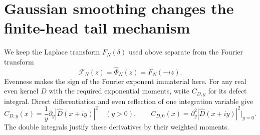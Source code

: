 \documentclass[11pt]{article}
\theoremstyle{remark}\newtheorem{remark}[theorem]{Remark}
\begin{document}
\section{Gaussian smoothing changes the finite-head tail mechanism}
We keep the Laplace transform $F_N(\delta)$ used above separate from
the Fourier transform
\[
 \mathcal F_N(z)=\widehat\Phi_N(z)=F_N(-iz).
\]
Evenness makes the sign of the Fourier exponent immaterial here.
For any real even kernel $D$ with the required exponential moments,
write $C_{D,y}$ for its defect integral. Direct differentiation and
even reflection of one integration variable give
\[
 C_{D,y}(x)=\frac1y\partial_y|\widehat D(x+iy)|^2\quad(y>0),
 \qquad C_{D,0}(x)=\partial_y^2|\widehat D(x+iy)|^2\big|_{y=0}.
                                                               \tag{DI}
\]
The double integrals justify these derivatives by their weighted moments.
\end{document}
